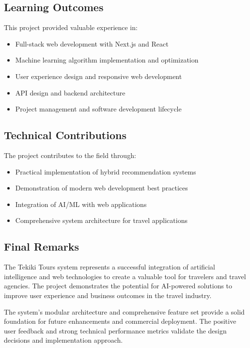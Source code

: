 \documentclass[12pt,a4paper]{article}
\begin{document}
\subsection{Learning Outcomes}
This project provided valuable experience in:
\begin{itemize}
    \item Full-stack web development with Next.js and React
    \item Machine learning algorithm implementation and optimization
    \item User experience design and responsive web development
    \item API design and backend architecture
    \item Project management and software development lifecycle
\end{itemize}

\subsection{Technical Contributions}
The project contributes to the field through:
\begin{itemize}
    \item Practical implementation of hybrid recommendation systems
    \item Demonstration of modern web development best practices
    \item Integration of AI/ML with web applications
    \item Comprehensive system architecture for travel applications
\end{itemize}

\subsection{Final Remarks}
The Tekiki Tours system represents a successful integration of artificial intelligence and web technologies to create a valuable tool for travelers and travel agencies. The project demonstrates the potential for AI-powered solutions to improve user experience and business outcomes in the travel industry.

The system's modular architecture and comprehensive feature set provide a solid foundation for future enhancements and commercial deployment. The positive user feedback and strong technical performance metrics validate the design decisions and implementation approach.

\newpage

\end{document}

